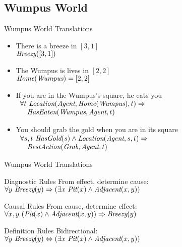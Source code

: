 \documentclass[12pt]{beamer}
\newcommand{\EM}[1]{\mbox{\em#1}}
\newcommand{\tab}{\hspace{1em}}
\newcommand{\nl}{\vspace{1em}}
\newcommand{\limpl}{\Rightarrow}
\newcommand{\liff}{\Leftrightarrow}
\begin{document}
\subsection{Wumpus World}
\begin{frame}{Wumpus World Translations}
	\begin{itemize}
		\item
			There is a breeze in $[3, 1]$ \\
			\pause
			$\EM{Breezy}([3, 1])$
		\pause
		\nl
		\item
			The Wumpus is lives in $[2, 2]$ \\
			\pause
			$\EM{Home}(\EM{Wumpus}) = [2, 2]$
		\pause
		\nl
		\item
			If you are in the Wumpus's square, he eats you \\
			\pause
			$
			\begin{array}{ll}
			\lefteqn{\forall t\ \EM{Location}(\EM{Agent}, \EM{Home}(\EM{Wumpus}), t) \limpl \mbox{}} \\
			& \EM{HasEaten}(\EM{Wumpus}, \EM{Agent}, t)
			\end{array}
			$
		\pause
		\nl
		\item
			You should grab the gold when you are in its square \\
			\pause
			$
			\begin{array}{ll}
			\lefteqn{\forall s,t\ \EM{HasGold}(s) \land \EM{Location}(\EM{Agent}, s, t) \limpl \mbox{}} \\
			& \EM{BestAction}(\EM{Grab}, \EM{Agent}, t)
			\end{array}
			$
	\end{itemize}
\end{frame}
\begin{frame}{Wumpus World Translations}
	\begin{block}{Diagnostic Rules}
		From effect, determine cause: \\
		\tab\tab$\forall y\ \EM{Breezy}(y) \limpl (\exists x\ \EM{Pit}(x) \land \EM{Adjacent}(x, y))$
	\end{block}
	\pause
	\begin{block}{Causal Rules}
		From cause, determine effect: \\
		\tab\tab$\forall x,y\ (\EM{Pit}(x) \land \EM{Adjacent}(x, y)) \limpl \EM{Breezy}(y)$
	\end{block}
	\pause
	\begin{block}{Definition Rules}
		Bidirectional: \\
		\tab\tab$\forall y\ \EM{Breezy}(y) \liff (\exists x\ \EM{Pit}(x) \land \EM{Adjacent}(x, y))$
	\end{block}
\end{frame}
\end{document}
